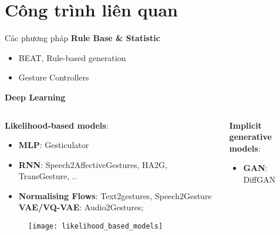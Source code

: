 \section{Công trình liên quan}

\begin{frame}{Các phương pháp}
\textbf{Rule Base \& Statistic}
\begin{itemize}
	\small
	\item BEAT, Rule-based generation  \cite{cassell2001beat}
	\item Gesture Controllers  \cite{levine2010gesture}
\end{itemize}

\textbf{Deep Learning}
\begin{columns}
	\begin{column}{0.5\textwidth}
			{
			\small
			\textbf{Likelihood-based models}:
			\begin{itemize}
				\item \textbf{MLP}: Gesticulator
				\item \textbf{RNN}: Speech2AffectiveGestures, HA2G, TransGesture, .. 
				\item \textbf{Normalising Flows}: Text2gestures, Speech2Gesture
				\textbf{VAE/VQ-VAE}:  Audio2Gestures; 
				\end{itemize}
			}
			 \begin{figure}
				\texttt{[image: likelihood\_based\_models]}
			\end{figure}
	\end{column}
	\hspace{-20pt}
	\begin{column}{0.5\textwidth}
		{
			\small
			\textbf{Implicit generative models}:
\begin{itemize}
			\item \textbf{GAN}: DiffGAN
			

\end{itemize}}
\end{column}
\end{columns}
\end{frame}
